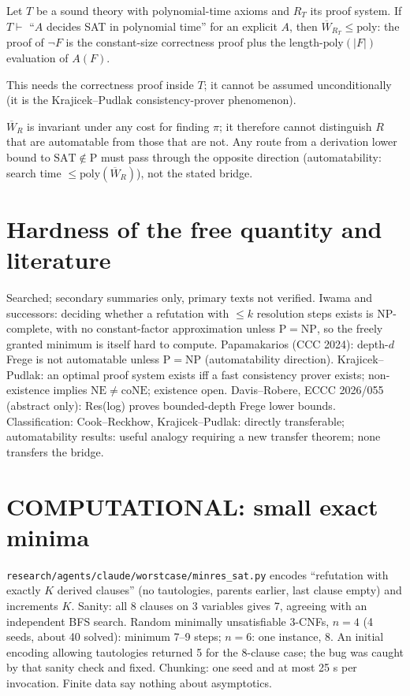 \documentclass{article}\usepackage{amsmath,amssymb,amsthm}
\begin{document}
\begin{prop}
Let $T$ be a sound theory with polynomial-time axioms and $R_T$ its proof system. If $T\vdash$ ``$A$ decides SAT in polynomial time'' for an explicit $A$, then $\overline W_{R_T}\le\mathrm{poly}$: the proof of $\neg F$ is the constant-size correctness proof plus the length-$\mathrm{poly}(|F|)$ evaluation of $A(F)$.
\end{prop}
This needs the correctness proof inside $T$; it cannot be assumed unconditionally (it is the Krajicek--Pudlak consistency-prover phenomenon).

\begin{prop}
$\overline W_R$ is invariant under any cost for finding $\pi$; it therefore cannot distinguish $R$ that are automatable from those that are not. Any route from a derivation lower bound to $\mathrm{SAT}\notin\mathrm P$ must pass through the opposite direction (automatability: search time $\le\mathrm{poly}(\overline W_R)$), not the stated bridge.
\end{prop}

\section{Hardness of the free quantity and literature}
Searched; secondary summaries only, primary texts not verified. Iwama and successors: deciding whether a refutation with $\le k$ resolution steps exists is NP-complete, with no constant-factor approximation unless $\mathrm P=\mathrm{NP}$, so the freely granted minimum is itself hard to compute. Papamakarios (CCC 2024): depth-$d$ Frege is not automatable unless $\mathrm P=\mathrm{NP}$ (automatability direction). Krajicek--Pudlak: an optimal proof system exists iff a fast consistency prover exists; non-existence implies $\mathrm{NE}\ne\mathrm{coNE}$; existence open. Davis--Robere, ECCC 2026/055 (abstract only): Res(log) proves bounded-depth Frege lower bounds. Classification: Cook--Reckhow, Krajicek--Pudlak: directly transferable; automatability results: useful analogy requiring a new transfer theorem; none transfers the bridge.

\section{COMPUTATIONAL: small exact minima}
\texttt{research/agents/claude/worstcase/minres\_sat.py} encodes ``refutation with exactly $K$ derived clauses'' (no tautologies, parents earlier, last clause empty) and increments $K$. Sanity: all 8 clauses on 3 variables gives 7, agreeing with an independent BFS search. Random minimally unsatisfiable 3-CNFs, $n=4$ (4 seeds, about 40 solved): minimum 7--9 steps; $n=6$: one instance, 8. An initial encoding allowing tautologies returned 5 for the 8-clause case; the bug was caught by that sanity check and fixed. Chunking: one seed and at most 25 s per invocation. Finite data say nothing about asymptotics.
\end{document}
